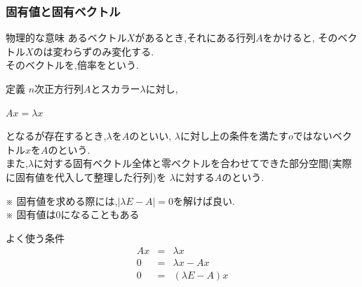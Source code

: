 \documentclass[a4paper]{jsarticle}
\begin{document}
\subsubsection{固有値と固有ベクトル}
\begin{itembox}[l]{物理的な意味}
    あるベクトル$X$があるとき,それにある行列$A$をかけると,
    そのベクトル$X$のは変わらずのみ変化する.\\
    そのベクトルを,倍率をという.
\end{itembox}
\begin{itembox}[l]{定義}
    $n$次正方行列$A$とスカラー$\lambda$に対し,
    \begin{center}
        $Ax=\lambda x$
    \end{center}
    となるが存在するとき,$\lambda$を$A$のといい,
    $\lambda$に対し上の条件を満たす$o$ではないベクトル$x$を$A$のという.\\
    また,$\lambda$に対する固有ベクトル全体と零ベクトルを合わせてできた部分空間(実際に固有値を代入して整理した行列)を
    $\lambda$に対する$A$のという.
\end{itembox}
※ 固有値を求める際には,$|\lambda E-A|=0$を解けば良い.\\
※ 固有値は$0$になることもある\\
\begin{itembox}[l]{よく使う条件}
    \begin{eqnarray*}
        Ax&=&\lambda x\\
        0&=&\lambda x-Ax\\
        0&=&\left(\lambda E -A\right)x\\
    \end{eqnarray*}
\end{itembox}
\end{document}
